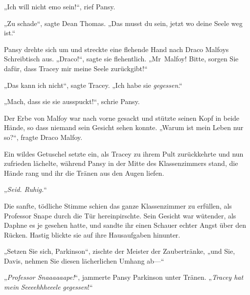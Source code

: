 „Ich will nicht emo sein!“, rief Pansy.

„Zu schade“, sagte Dean Thomas. „Das musst du sein, jetzt wo deine Seele weg ist.“

Pansy drehte sich um und streckte eine flehende Hand nach Draco Malfoys Schreibtisch aus. „Draco!“, sagte sie flehentlich. „Mr~Malfoy! Bitte, sorgen Sie dafür, dass Tracey mir meine Seele zurückgibt!“

„Das kann ich nicht“, sagte Tracey. „Ich habe sie \emph{gegessen}.“

„Mach, dass sie sie ausspuckt!“, schrie Pansy.

Der Erbe von Malfoy war nach vorne gesackt und stützte seinen Kopf in beide Hände, so dass niemand sein Gesicht sehen konnte. „Warum ist mein Leben nur so?“, fragte Draco Malfoy.

Ein wildes Getuschel setzte ein, als Tracey zu ihrem Pult zurückkehrte und nun zufrieden lächelte, während Pansy in der Mitte des Klassenzimmers stand, die Hände rang und ihr die Tränen aus den Augen liefen.

„\emph{Seid. Ruhig.}“

Die sanfte, tödliche Stimme schien das ganze Klassenzimmer zu erfüllen, als Professor Snape durch die Tür hereinpirschte. Sein Gesicht war wütender, als Daphne es je gesehen hatte, und sandte ihr einen Schauer echter Angst über den Rücken. Hastig blickte sie auf ihre Hausaufgaben hinunter.

„Setzen Sie sich, Parkinson“, zischte der Meister der Zaubertränke, „und Sie, Davis, nehmen Sie diesen lächerlichen Umhang ab—“

„\emph{Professor Snaaaaaape!}“, jammerte Pansy Parkinson unter Tränen. „\emph{Tracey hat mein} \emph{Seeeehhheeele} \emph{gegessen}!“


